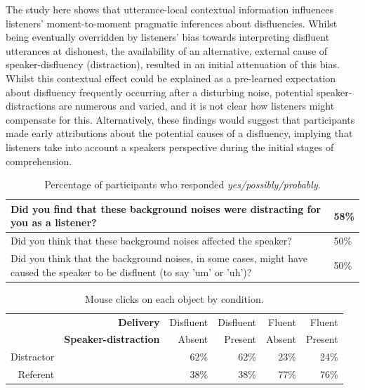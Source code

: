 \documentclass[man]{apa6}
\begin{document}
The study here shows that utterance-local contextual information influences listeners' moment-to-moment pragmatic inferences about disfluencies. 
Whilst being eventually overridden by listeners' bias towards interpreting disfluent utterances at dishonest, the availability of an alternative, external cause of speaker-disfluency (distraction), resulted in an initial attenuation of this bias. 
Whilst this contextual effect could be explained as a pre-learned expectation about disfluency frequently occurring after a disturbing noise, potential speaker-distractions are numerous and varied, and it is not clear how listeners might compensate for this. 
Alternatively, these findings would suggest that participants made early attributions about the potential causes of a disfluency, implying that listeners take into account a speakers perspective during the initial stages of comprehension. 






\newpage

\begin{table}[ht]
\centering
\begin{tabularx}{\linewidth}{|X|X|}
	\hline
Did you find that these background noises were distracting for you as a listener? & 58\%\\ 
   \hline
Did you think that these background noises affected the speaker? & 50\%\\
   \hline
Did you think that the background noises, in some cases, might have caused the speaker to be disfluent (to say 'um' or 'uh')? & 50\%\\
   \hline
\end{tabularx}
\caption{Percentage of participants who responded \textit{yes/possibly/probably}.}
\label{table:questions}
\end{table}


\begin{table}[ht]
\centering
\begin{tabular}{rrrrrr}
  \hline
& \textbf{Delivery} & Disfluent & Disfluent & Fluent & Fluent \\ 
& \textbf{Speaker-distraction} & Absent & Present & Absent & Present \\
  \hline
Distractor & &  62\% &  62\% &  23\% &  24\% \\ 
  Referent & &  38\% &  38\% &  77\% &  76\% \\ 
   \hline
\end{tabular}
\caption{Mouse clicks on each object by condition.}
\label{table:objctclck}
\end{table}
\end{document}
